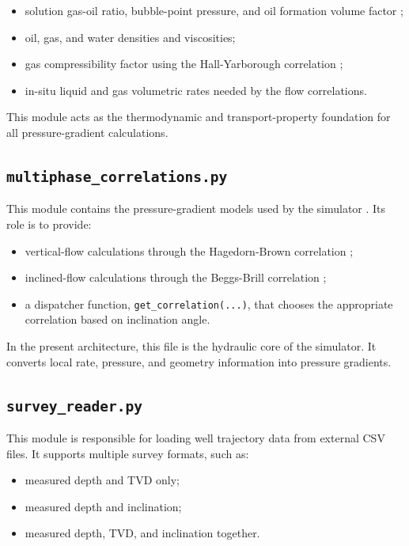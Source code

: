 \begin{itemize}
    \item solution gas-oil ratio, bubble-point pressure, and oil formation
          volume factor \cite{Standing1977};
    \item oil, gas, and water densities and viscosities;
    \item gas compressibility factor using the Hall-Yarborough correlation
          \cite{HallYarborough1974};
    \item in-situ liquid and gas volumetric rates needed by the flow
          correlations.
\end{itemize}

This module acts as the thermodynamic and transport-property foundation for all
pressure-gradient calculations.

\subsection*{\texttt{multiphase\_correlations.py}}

This module contains the pressure-gradient models used by the simulator
\cite{BeggsBrill1973,HagedornBrown1965}. Its role is to provide:

\begin{itemize}
    \item vertical-flow calculations through the Hagedorn-Brown correlation
          \cite{HagedornBrown1965};
    \item inclined-flow calculations through the Beggs-Brill correlation
          \cite{BeggsBrill1973};
    \item a dispatcher function, \texttt{get\_correlation(...)}, that chooses
          the appropriate correlation based on inclination angle.
\end{itemize}

In the present architecture, this file is the hydraulic core of the simulator.
It converts local rate, pressure, and geometry information into pressure
gradients.

\subsection*{\texttt{survey\_reader.py}}

This module is responsible for loading well trajectory data from external CSV
files. It supports multiple survey formats, such as:

\begin{itemize}
    \item measured depth and TVD only;
    \item measured depth and inclination;
    \item measured depth, TVD, and inclination together.
\end{itemize}

